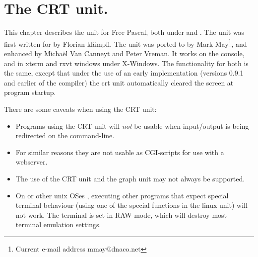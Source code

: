 %
%
%
%
%
\chapter{The CRT unit.}
\label{ch:crtunit}

This chapter describes the  unit for Free Pascal, both under \dos
\linux and \windows. The unit was first written for \dos by Florian kl\"ampfl. 
The unit was ported to \linux by Mark May\footnote{Current
e-mail address \textsf{mmay@dnaco.net}}, and enhanced by Micha\"el Van Canneyt
and Peter Vreman. It works on the \linux console, and in xterm and rxvt windows
under X-Windows. The functionality for both is the same, except that under
\linux the use of an early implementation (versions 0.9.1 and earlier of the
compiler) the crt unit automatically cleared the screen at program startup.

There are some caveats when using the CRT unit:
\begin{itemize}
\item Programs using the CRT unit will {\em not} be usable when input/output 
is being redirected on the command-line.

\item For similar reasons they are not usable as CGI-scripts for use with a 
webserver. 

\item The use of the CRT unit and the graph unit may not always be supported. 

\item On \linux or other unix OSes , executing other programs that expect 
special terminal behaviour (using one of the special functions in the linux
unit) will not work. The terminal is set in RAW mode, which will destroy
most terminal emulation settings.
\end{itemize}

